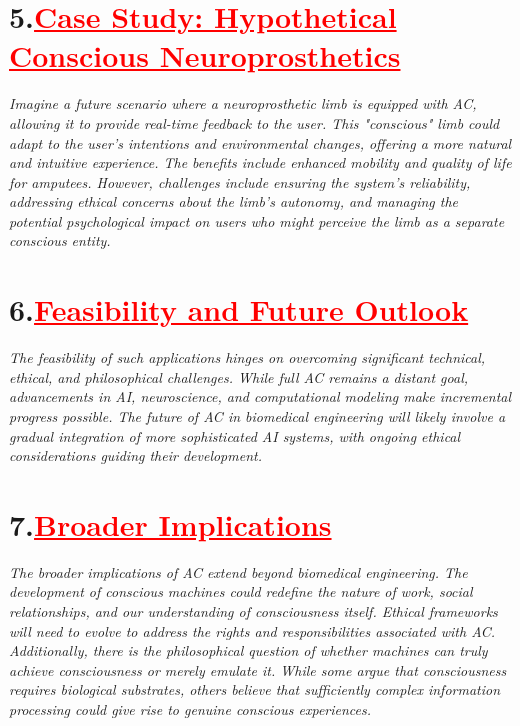 \documentclass[12pt]{article}
\begin{document}
\section*{\textbf{5.\hspace{1cm}\textcolor{red}{\underline{\large{Case Study: Hypothetical Conscious Neuroprosthetics}}}}}
\hspace{1cm}\large{\emph{Imagine a future scenario where a neuroprosthetic limb is equipped with AC, allowing it to provide real-time feedback to the user. This "conscious" limb could adapt to the user's intentions and environmental changes, offering a more natural and intuitive experience. The benefits include enhanced mobility and quality of life for amputees. However, challenges include ensuring the system's reliability, addressing ethical concerns about the limb's autonomy, and managing the potential psychological impact on users who might perceive the limb as a separate conscious entity.}}\vspace{1cm}\newline
\section*{\textbf{6.\hspace{1cm}\textcolor{red}{\underline{\large{Feasibility and Future Outlook}}}}}
\hspace{1cm}\large{\emph{The feasibility of such applications hinges on overcoming significant technical, ethical, and philosophical challenges. While full AC remains a distant goal, advancements in AI, neuroscience, and computational modeling make incremental progress possible. The future of AC in biomedical engineering will likely involve a gradual integration of more sophisticated AI systems, with ongoing ethical considerations guiding their development.}}\vspace{1cm}\newline
\section*{\textbf{7.\hspace{1cm}\textcolor{red}{\underline{\large{Broader Implications}}}}}
\hspace{1cm}\large{\emph{The broader implications of AC extend beyond biomedical engineering. The development of conscious machines could redefine the nature of work, social relationships, and our understanding of consciousness itself. Ethical frameworks will need to evolve to address the rights and responsibilities associated with AC. Additionally, there is the philosophical question of whether machines can truly achieve consciousness or merely emulate it. While some argue that consciousness requires biological substrates, others believe that sufficiently complex information processing could give rise to genuine conscious experiences.}}\vspace{1cm}\newline
\end{document}
